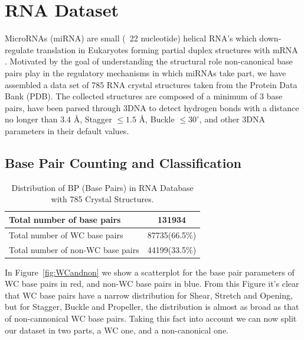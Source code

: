 \chapter{RNA Dataset}

%
\label{clustering} 
MicroRNAs (miRNA) are small (~22 nucleotide) helical RNA's which
down-regulate translation in Eukaryotes forming partial duplex
structures with mRNA \cite{ruvkun2001}. Motivated by the goal of
understanding the structural role non-canonical base pairs play in the regulatory
mechanisms in which miRNAs take part, we have assembled a data set of
785 RNA crystal structures taken from the Protein Data Bank (PDB). The
collected structures are composed of a minimum of 3 base pairs, have
been parsed through 3DNA to detect hydrogen bonds with a distance no
longer than $3.4$ \AA, Stagger $ \le 1.5$ \AA, Buckle $ \le 30^{\circ}$, and
other 3DNA parameters in their default values.

\section{Base Pair Counting and Classification}
\setlongtables
\begin{center}
\begin{longtable}{l|c}
\caption{Distribution of BP (Base Pairs) in RNA Database with 785
  Crystal Structures.} \label{tab:all}\\
\hline
Total number of base pairs & 131934   \\ \hline
Total number of WC base pairs & 87735(66.5\%)   \\ \hline
Total number of non-WC base pairs & 44199(33.5\%)  \\ \hline
\end{longtable}
\end{center}

In Figure~\ref{fig:WCandnon} we show a scatterplot for the base pair parameters of WC 
base pairs in red, and non-WC base pairs in blue. From this Figure
it's clear that WC base pairs have a narrow distribution for Shear, Stretch and Opening, 
but for Stagger, Buckle and Propeller, the distribution is almost as broad as that of
non-cannonical WC base pairs. Taking this fact into account we can now
split our dataset in two parts, a WC one, and a non-canonical one.

